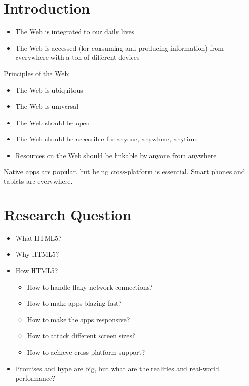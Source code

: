 \documentclass[a4paper,12pt]{article}
\title{}
\author{\textbf{Kimmo Puputti}\\kimmo.puputti@futurice.com\\\url{http://kpuputti.fi/}}
\begin{document}
\maketitle
\clearpage

\section{Introduction}

\begin{itemize}
\item The Web is integrated to our daily lives
\item The Web is accessed (for consuming and producing information)
  from everywhere with a ton of different devices
\end{itemize}

\noindent Principles of the Web:

\begin{itemize}
\item The Web is ubiquitous
\item The Web is universal
\item The Web should be open
\item The Web should be accessible for anyone, anywhere, anytime
\item Resources on the Web should be linkable by anyone from anywhere
\end{itemize}

\noindent Native apps are popular, but being cross-platform is
essential. Smart phones and tablets are everywhere.

\section{Research Question}

\begin{itemize}
\item What HTML5?
\item Why HTML5?
\item How HTML5?
  \begin{itemize}
  \item How to handle flaky network connections?
  \item How to make apps blazing fast?
  \item How to make the apps responsive?
  \item How to attack different screen sizes?
  \item How to achieve cross-platform support?
  \end{itemize}
\item Promises and hype are big, but what are the realities and
  real-world performance?
\end{itemize}
\end{document}
